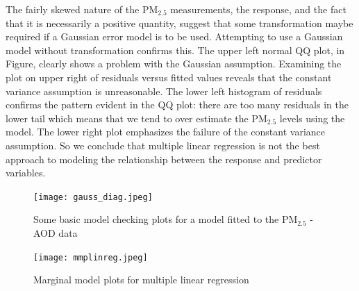 \documentclass[10pt]{article}
\def\PM{{\mathrm{PM_{2.5}}}}
\begin{document}
The fairly skewed nature of the $\PM$ measurements, the response, and the fact that it is necessarily a positive quantity, suggest that some transformation maybe required if a Gaussian error model is to be used. Attempting to use a Gaussian model without transformation confirms this. The upper left normal QQ plot, in Figure, clearly shows a problem with the Gaussian assumption. Examining the plot on upper right of residuals versus fitted values reveals that the constant variance assumption is unreasonable. The lower left histogram of residuals confirms the pattern evident in the QQ plot: there are too many residuals in the lower tail which means that we tend to over estimate the $\PM$ levels using the model. The lower right plot emphasizes the failure of the constant variance assumption. So we conclude that multiple linear regression is not the best approach to modeling the relationship between the response and predictor variables. \\ 

\begin{figure}[H]
\centering
\texttt{[image: gauss\_diag.jpeg]} 
\caption{Some basic model checking plots for a model fitted to the $\PM$ - AOD data} 
\end{figure}

\begin{figure}[H]
\centering 
\texttt{[image: mmplinreg.jpeg]}
\caption{Marginal model plots for multiple linear regression}
\end{figure}
\end{document}
